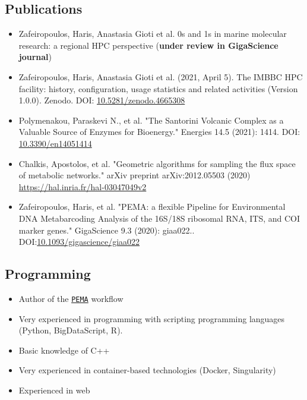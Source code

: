 \documentclass{article}
\begin{document}
\subsection{Publications}

\begin{itemize}

   \item Zafeiropoulos, Haris, Anastasia Gioti et al. 0s and 1s in marine molecular research: a regional HPC perspective (\textbf{under review in GigaScience journal})

   \item Zafeiropoulos, Haris, Anastasia Gioti et al. (2021, April 5). The IMBBC HPC facility: history, configuration, usage statistics and related activities (Version 1.0.0). Zenodo. DOI: \href{http://doi.org/10.5281/zenodo.4665308}{10.5281/zenodo.4665308}

   \item Polymenakou, Paraskevi N., et al. "The Santorini Volcanic Complex as a Valuable Source of Enzymes for Bioenergy." Energies 14.5 (2021): 1414. DOI: \href{https://doi.org/10.3390/en14051414}{10.3390/en14051414}
   
   \item Chalkis, Apostolos, et al. "Geometric algorithms for sampling the flux space of metabolic networks." arXiv preprint arXiv:2012.05503 (2020) \href{https://hal.inria.fr/hal-03047049v2}{https://hal.inria.fr/hal-03047049v2}
   
   \item Zafeiropoulos, Haris, et al. "PEMA: a flexible Pipeline for Environmental DNA Metabarcoding Analysis of the 16S/18S ribosomal RNA, ITS, and COI marker genes." GigaScience 9.3 (2020): giaa022.. 
   DOI:\href{https://doi.org/10.1093/gigascience/giaa022}{10.1093/gigascience/giaa022}
   
\end{itemize}


\subsection{Programming}

\begin{itemize}
   \item Author of the \href{https://github.com/hariszaf/pema}{\texttt{PEMA}} workflow
   \item Very experienced in programming with scripting programming languages \\
   (Python, BigDataScript, R).
   \item Basic knowledge of C++
   \item Very experienced in container-based technologies (Docker, Singularity)
   \item Experienced in web 
\end{itemize}
\end{document}
